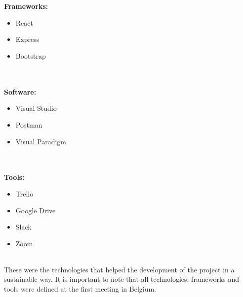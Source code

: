 \\ \\

\textbf{Frameworks:}

\begin{itemize}
\item
React
\item 
Express
\item 
Bootstrap
\end{itemize}

\\ \\

\textbf{Software:}

\begin{itemize}
\item
Visual Studio
\item 
Postman
\item 
Visual Paradigm
\end{itemize}

\\ \\

\textbf{Tools:}

\begin{itemize}
\item
Trello
\item 
Google Drive
\item 
Slack
\item 
Zoom
\end{itemize}

\\
These were the technologies that helped the development of the project in a sustainable way. It is important to note that all technologies, frameworks and tools were defined at the first meeting in Belgium.
